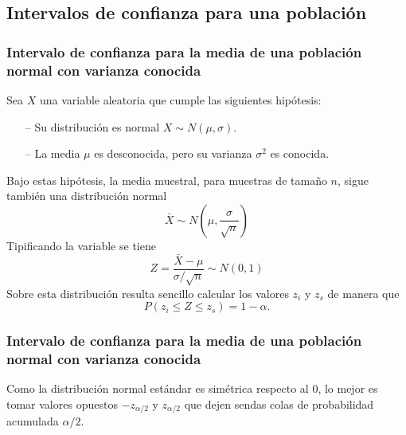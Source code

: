 \subsection{Intervalos de confianza para una población}
\begin{frame}
\frametitle{Intervalo de confianza para la media de una población normal con varianza conocida}
Sea $X$ una variable aleatoria que cumple las siguientes hipótesis:
\begin{itemize}
\item[--] Su distribución es normal $X\sim N(\mu,\sigma)$.
\item[--] La media $\mu$ es desconocida, pero su varianza $\sigma^2$ es conocida.
\end{itemize}

Bajo estas hipótesis, la media muestral, para muestras de tamaño $n$, sigue también una distribución normal
\[
\bar X \sim N\left(\mu,\frac{\sigma}{\sqrt n}\right)
\]
Tipificando la variable se tiene
\[
Z=\frac{\bar X-\mu}{\sigma/\sqrt n} \sim N(0,1)
\]
Sobre esta distribución resulta sencillo calcular los valores $z_i$ y $z_s$ de manera que
\[
P(z_i\leq Z \leq z_s) = 1-\alpha.
\]
\end{frame}


\begin{frame}
\frametitle{Intervalo de confianza para la media de una población normal con varianza conocida}
Como la distribución normal estándar es simétrica respecto al 0, lo mejor es tomar valores opuestos $-z_{\alpha/2}$ y $z_{\alpha/2}$ que dejen sendas colas de probabilidad acumulada $\alpha/2$.
\begin{center}
\scalebox{0.8}{}
\end{center}
\end{frame}


